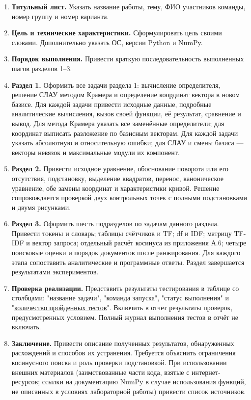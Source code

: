 \documentclass[12pt,a4paper]{article}
\begin{document}
\begin{enumerate}
\item \textbf{Титульный лист.} Указать название работы, тему, ФИО участников команды, номер группу
и номер варианта.
\item \textbf{Цель и технические характеристики.} Сформулировать цель своими словами.
Дополнительно указать ОС, версии Python и NumPy.
\item \textbf{Порядок выполнения.} Привести краткую последовательность выполненных шагов разделов 1--3.
\item \textbf{Раздел 1.} Оформить все задачи раздела 1: вычисление определителя, решение СЛАУ методом Крамера и определение координат вектора в новом базисе. 
Для каждой задачи привести исходные данные, подробные аналитические вычисления,
вызов своей функции, её результат, сравнение и вывод.
Для метода Крамера указать все заменённые определители; для координат выписать разложение по базисным векторам. Для каждой задачи указать
абсолютную и относительную ошибки; для СЛАУ и смены базиса ---
векторы невязок и максимальные модули их компонент.
\item \textbf{Раздел 2.} Привести исходное уравнение, обоснование поворота
или его отсутствия, подстановку, выделение квадратов, перенос,
каноническое уравнение, обе замены координат и характеристики кривой.
Решение сопровождается проверкой двух контрольных точек с полными подстановками и двумя рисунками.
\item \textbf{Раздел 3.} Оформить шесть подразделов по задачам данного раздела.
Привести токены и словарь; таблицы счётчиков и TF; df и IDF;
матрицу TF-IDF и вектор запроса; отдельный расчёт косинуса из приложения А.6;
четыре поисковые оценки и порядок документов после ранжирования. Для каждого этапа сопоставить
аналитические и программные ответы. Раздел завершается результатами экспериментов.
\item \textbf{Проверка реализации.} Представить результаты тестирования
в таблице со столбцами: "название задачи", "команда запуска",
"статус выполнения" и "\underline{количество пройденных тестов}".
Включить в отчет результаты проверок, предусмотренных условием.
Полный журнал выполнения тестов в отчёт не включать.
\item \textbf{Заключение.} Привести описание полученных результатов, обнаруженных
расхождений и способов их устранения. Требуется объяснить ограничения косинусного
поиска и роль проверки подстановкой. При использовании внешних материалов (заимствованные части кода, взятые с интернет-ресурсов; ссылки на документацию NumPy в случае использования функций, не описанных в условиях лабораторной работы)
привести список источников.
\end{enumerate}
\end{document}
